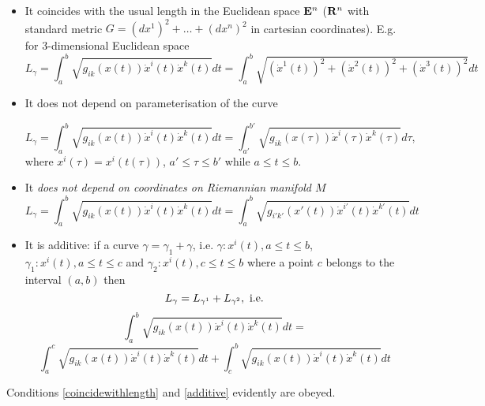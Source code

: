 \documentclass[12pt]{article}
\theoremstyle{theorem}
\numberwithin{equation}{section}
\begin{document}
\begin{itemize}

\item It coincides with the usual length in the Euclidean space ${\bf E}^n$
(${\bf R}^n$ with standard metric  $G=(dx^1)^2+\dots+(dx^n)^2$
in cartesian coordinates). E.g. for $3$-dimensional Euclidean space
\begin{equation}\label{coincidewithlength}
      L_\gamma=
  \int_a^b \sqrt {g_{ik}(x(t))\dot x^i(t) \dot x^k(t)}dt=
  \int_a^b \sqrt{(\dot x^1(t))^2+(\dot x^2(t))^2+(\dot x^3(t))^2}dt
\end{equation}


\item It does not depend on parameterisation of the curve

\begin{equation}\label{independenceon parameterisation}
    L_\gamma=  \int_a^b \sqrt {g_{ik}(x(t))\dot x^i(t) \dot x^k(t)}dt=
        \int_{a'}^{b'} \sqrt {g_{ik}(x(\tau))\dot x^i(\tau) \dot x^k(\tau)}d\tau,
\end{equation}
where $x^i(\tau)=x^i(t(\tau))$, $a'\leq \tau\leq b'$ while $a\leq t\leq b$.


\item It {\it does not depend on coordinates on Riemannian manifold $M$}
 \begin{equation}\label{independence on coordinates}
    L_\gamma=  \int_a^b \sqrt {g_{ik}(x(t))\dot x^i(t) \dot x^k(t)}dt=
    \int_a^b \sqrt {g_{i'k'}(x'(t))\dot x^{i'}(t) \dot x^{k'}(t)}dt
 \end{equation}

\item  It is additive: if a curve  $\gamma=\gamma_1+\gamma$, i.e. $\gamma\colon x^i(t), a\leq t\leq b$,
$\gamma_1\colon x^i(t), a\leq t\leq c$ and $\gamma_2\colon x^i(t), c\leq t\leq b$ where
a point $c$ belongs to the interval $(a,b)$ then
                 $$
              L_{\gamma}=L_{\gamma^1}+L_{\gamma^2},\,\, {\rm i.e.}
                 $$
                 $$
                 \int_a^b \sqrt {g_{ik}(x(t))\dot x^i(t) \dot x^k(t)}dt=
                 $$
             \begin{equation}\label{additive}
             \int_a^c \sqrt {g_{ik}(x(t))\dot x^i(t) \dot x^k(t)}dt+
             \int_c^b \sqrt {g_{ik}(x(t))\dot x^i(t) \dot x^k(t)}dt
             \end{equation}
             \end{itemize}

Conditions \eqref{coincidewithlength} and \eqref{additive} evidently are obeyed.
\end{document}
